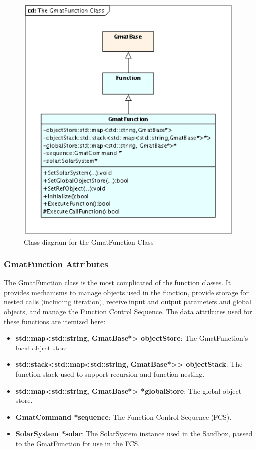 \begin{figure}[htb]
\begin{center}
\includegraphics[scale=0.5]{Images/TheGmatFunctionClass.eps}
\caption{\label{figure:GmatFunctionClass}Class diagram for the GmatFunction Class}
\end{center}
\end{figure}

\subsubsection{GmatFunction Attributes}

The GmatFunction class is the most complicated of the function classes.  It provides mechanisms to
manage objects used in the function, provide storage for nested calls (including iteration),
receive input and output parameters and global objects, and manage the Function Control Sequence. 
The data attributes used for these functions are itemized here:

\begin{itemize}
\item \textbf{std::map<std::string, GmatBase*> objectStore}:  The GmatFunction's local object store.
\item \textbf{std::stack<std::map<std::string, GmatBase*>> objectStack}:  The function stack used
to support recursion and function nesting.
\item \textbf{std::map<std::string, GmatBase*> *globalStore}:  The global object store.
\item \textbf{GmatCommand *sequence}: The Function Control Sequence (FCS).
\item \textbf{SolarSystem *solar}:  The SolarSystem instance used in the Sandbox, passed to the
GmatFunction for use in the FCS.
\end{itemize}

